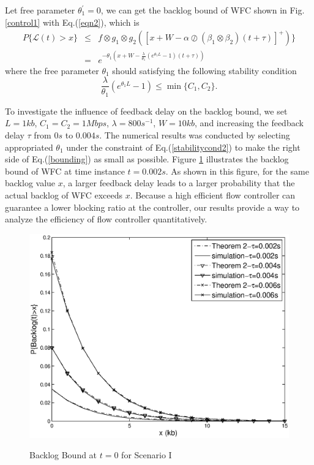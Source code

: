 \documentclass[paper]{ieice}
\begin{document}
Let free parameter $\theta_1^\prime=0$, we can get the backlog bound of WFC shown in Fig. \ref{control1} with Eq.(\ref{eqn2}), which is
\begin{eqnarray}\label{bounding}
P\{\mathcal{L}(t)>x\}&\leq& f\otimes g_1\otimes g_2([x+W-\alpha\oslash(\beta_1\otimes\beta_2)(t+\tau)]^+)\}\nonumber\\
&=& e^{-\theta_1(x+W-\frac{\lambda}{\theta_1}(e^{\theta_1 L}-1)(t+\tau))}
\end{eqnarray}
where the free parameter $\theta_1$ should satisfying the following stability condition
\begin{equation}\label{stabilitycond2}
\frac{\lambda}{\theta_1}(e^{\theta_1 L}-1)\leq \min\{C_1,C_2\}.
\end{equation}

To investigate the influence of feedback delay on the backlog bound, we set $L=1kb$, $C_1=C_2=1Mbps$, $\lambda=800s^{-1}$, $W=10kb$, and increasing the feedback delay $\tau$ from $0s$ to $0.004s$. The numerical results was conducted by selecting appropriated $\theta_1$ under the constraint of Eq.(\ref{stabilitycond2}) to make the right side of Eq.(\ref{bounding}) as small as possible. Figure \ref{backlogtau} illustrates the backlog bound of WFC at time instance $t=0.002s$. As shown in this figure, for the same backlog value $x$, a larger feedback delay leads to a larger probability that the actual backlog of WFC exceeds $x$. Because a high efficient flow controller can guarantee a lower blocking ratio at the controller, our results  provide a way to analyze the efficiency of flow controller quantitatively.
\begin{figure}[bpt]
  \centering
  \includegraphics[scale=0.45]{figures/backlogtau.eps}\\
  \caption{Backlog Bound at $t=0$ for Scenario I}\label{backlogtau}
\end{figure}
\end{document}
